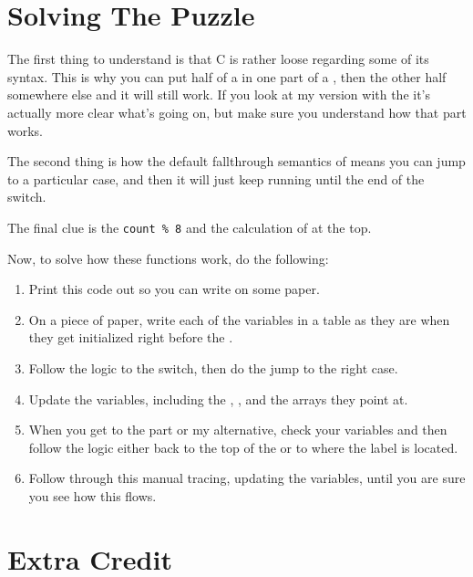 \section{Solving The Puzzle}

The first thing to understand is that C is rather loose regarding some
of its syntax.  This is why you can put half of a  in
one part of a , then the other half somewhere
else and it will still work.  If you look at my version with the 
it's actually more clear what's going on, but make sure you understand
how that part works.

The second thing is how the default fallthrough semantics of
 means you can jump to a particular case, and
then it will just keep running until the end of the switch.

The final clue is the \verb|count % 8| and the calculation of  at
the top.

Now, to solve how these functions work, do the following:

\begin{enumerate}
\item Print this code out so you can write on some paper.
\item On a piece of paper, write each of the variables in a table as they
    are when they get initialized right before the .
\item Follow the logic to the switch, then do the jump to the right case.
\item Update the variables, including the , , and the
    arrays they point at.
\item When you get to the  part or my  alternative,
    check your variables and then follow the logic either back to the
    top of the  or to where the  label is 
    located.
\item Follow through this manual tracing, updating the variables, until
    you are sure you see how this flows.
\end{enumerate}

\section{Extra Credit}

